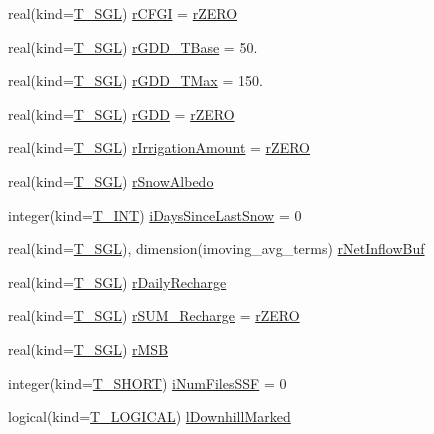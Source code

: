 \begin{DoxyCompactItemize}
\item 
real(kind=\hyperlink{namespacetest_a04d8b9090502de3a00046fe904bc3d99}{T\_\-SGL}) \hyperlink{typetest_1_1_t___c_e_l_l_ae75aac413c7f48930149ca3b03b5b428}{rCFGI} = \hyperlink{namespacetest_a9bd8aefd97474e9bd8eb52d36c5d1ea2}{rZERO}
\item 
real(kind=\hyperlink{namespacetest_a04d8b9090502de3a00046fe904bc3d99}{T\_\-SGL}) \hyperlink{typetest_1_1_t___c_e_l_l_a9fd25fac13ae62f555eb399cb06937f4}{rGDD\_\-TBase} = 50.
\item 
real(kind=\hyperlink{namespacetest_a04d8b9090502de3a00046fe904bc3d99}{T\_\-SGL}) \hyperlink{typetest_1_1_t___c_e_l_l_a3ab38a415a3d42b599c6a2002f412cec}{rGDD\_\-TMax} = 150.
\item 
real(kind=\hyperlink{namespacetest_a04d8b9090502de3a00046fe904bc3d99}{T\_\-SGL}) \hyperlink{typetest_1_1_t___c_e_l_l_add653d728642f8eb62103fbe816016bd}{rGDD} = \hyperlink{namespacetest_a9bd8aefd97474e9bd8eb52d36c5d1ea2}{rZERO}
\item 
real(kind=\hyperlink{namespacetest_a04d8b9090502de3a00046fe904bc3d99}{T\_\-SGL}) \hyperlink{typetest_1_1_t___c_e_l_l_aa6b89e6a922341235855da79acd6fedd}{rIrrigationAmount} = \hyperlink{namespacetest_a9bd8aefd97474e9bd8eb52d36c5d1ea2}{rZERO}
\item 
real(kind=\hyperlink{namespacetest_a04d8b9090502de3a00046fe904bc3d99}{T\_\-SGL}) \hyperlink{typetest_1_1_t___c_e_l_l_a91803afc7e547cdc09d7f7c3f201edc2}{rSnowAlbedo}
\item 
integer(kind=\hyperlink{namespacetest_a6f91ebd89b58cfcc5da99faed9385c1e}{T\_\-INT}) \hyperlink{typetest_1_1_t___c_e_l_l_a01c31db1b569e45ad8f2805a957e6dd0}{iDaysSinceLastSnow} = 0
\item 
real(kind=\hyperlink{namespacetest_a04d8b9090502de3a00046fe904bc3d99}{T\_\-SGL}), dimension(imoving\_\-avg\_\-terms) \hyperlink{typetest_1_1_t___c_e_l_l_ac5a0039d22d608a6b1c9f52941518668}{rNetInflowBuf}
\item 
real(kind=\hyperlink{namespacetest_a04d8b9090502de3a00046fe904bc3d99}{T\_\-SGL}) \hyperlink{typetest_1_1_t___c_e_l_l_a190431a3d42a9211cd8ff5d48f7d9124}{rDailyRecharge}
\item 
real(kind=\hyperlink{namespacetest_a04d8b9090502de3a00046fe904bc3d99}{T\_\-SGL}) \hyperlink{typetest_1_1_t___c_e_l_l_a342995e798c426e0bcfd5b6b41a11b45}{rSUM\_\-Recharge} = \hyperlink{namespacetest_a9bd8aefd97474e9bd8eb52d36c5d1ea2}{rZERO}
\item 
real(kind=\hyperlink{namespacetest_a04d8b9090502de3a00046fe904bc3d99}{T\_\-SGL}) \hyperlink{typetest_1_1_t___c_e_l_l_ad66f407f53e632d6081cd8ee2fa1d435}{rMSB}
\item 
integer(kind=\hyperlink{namespacetest_a78d9db20f77ee4f9cf3ac5abfb7062b9}{T\_\-SHORT}) \hyperlink{typetest_1_1_t___c_e_l_l_a8812998b5d87adc1af2ac71a4e83d116}{iNumFilesSSF} = 0
\item 
logical(kind=\hyperlink{namespacetest_acdeac586276a7d1d394fb5eddc77fc3d}{T\_\-LOGICAL}) \hyperlink{typetest_1_1_t___c_e_l_l_a591fa5f8996536c08d0f846978ddc8c4}{lDownhillMarked}
\end{DoxyCompactItemize}


